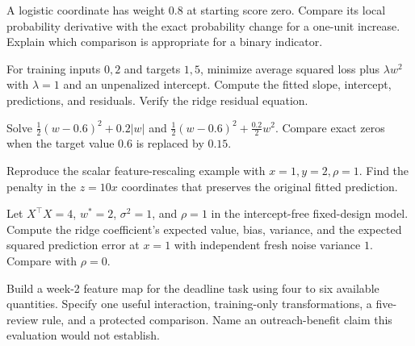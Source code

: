 \begin{exercises}
\item {}A logistic coordinate has weight $0.8$ at starting score zero. Compare its local probability derivative with the exact probability change for a one-unit increase. Explain which comparison is appropriate for a binary indicator.
\item {}For training inputs $0,2$ and targets $1,5$, minimize average squared loss plus $\lambda w^2$ with $\lambda=1$ and an unpenalized intercept. Compute the fitted slope, intercept, predictions, and residuals. Verify the ridge residual equation.
\item {}Solve $\tfrac12(w-0.6)^2+0.2|w|$ and $\tfrac12(w-0.6)^2+\tfrac{0.2}{2}w^2$. Compare exact zeros when the target value $0.6$ is replaced by $0.15$.
\item {}Reproduce the scalar feature-rescaling example with $x=1,y=2,\rho=1$. Find the penalty in the $z=10x$ coordinates that preserves the original fitted prediction.
\item {}Let $X^\top X=4$, $w^*=2$, $\sigma^2=1$, and $\rho=1$ in the intercept-free fixed-design model. Compute the ridge coefficient's expected value, bias, variance, and the expected squared prediction error at $x=1$ with independent fresh noise variance $1$. Compare with $\rho=0$.
\item {}Build a week-2 feature map for the deadline task using four to six available quantities. Specify one useful interaction, training-only transformations, a five-review rule, and a protected comparison. Name an outreach-benefit claim this evaluation would not establish.
\end{exercises}
\endgroup

